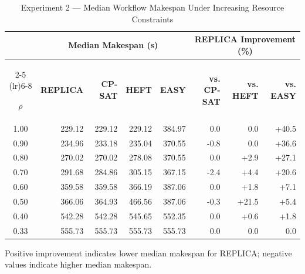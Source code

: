 
\begin{table}[!t]
\centering
\caption{Experiment 2 --- Median Workflow Makespan Under Increasing Resource Constraints}
\label{tab:exp2-scheduling}
\small
\setlength{\tabcolsep}{6pt}
\renewcommand{\arraystretch}{1.15}

\begin{tabular}{c rrrr rrr}
\toprule

& \multicolumn{4}{c}{\textbf{Median Makespan (s)}}
& \multicolumn{3}{c}{\textbf{REPLICA Improvement (\%)}} \\

\cmidrule(lr){2-5}
\cmidrule(lr){6-8}

\textbf{$\rho$} &
\textbf{REPLICA} &
\textbf{CP-SAT} &
\textbf{HEFT} &
\textbf{EASY} &
\textbf{vs. CP-SAT} &
\textbf{vs. HEFT} &
\textbf{vs. EASY} \\

\midrule
1.00 & 229.12 & 229.12 & 229.12 & 384.97 & 0.0 & 0.0 & +40.5 \\
0.90 & 234.96 & 233.18 & 235.04 & 370.55 & -0.8 & 0.0 & +36.6 \\
0.80 & 270.02 & 270.02 & 278.08 & 370.55 & 0.0 & +2.9 & +27.1 \\
0.70 & 291.68 & 284.86 & 305.15 & 367.15 & -2.4 & +4.4 & +20.6 \\
0.60 & 359.58 & 359.58 & 366.19 & 387.06 & 0.0 & +1.8 & +7.1 \\
0.50 & 366.06 & 364.93 & 466.56 & 387.06 & -0.3 & +21.5 & +5.4 \\
0.40 & 542.28 & 542.28 & 545.65 & 552.35 & 0.0 & +0.6 & +1.8 \\
0.33 & 555.73 & 555.73 & 555.73 & 555.73 & 0.0 & 0.0 & 0.0 \\
\bottomrule

\end{tabular}

\vspace{2pt}
\footnotesize
Positive improvement indicates lower median makespan for REPLICA;
negative values indicate higher median makespan.

\end{table}
